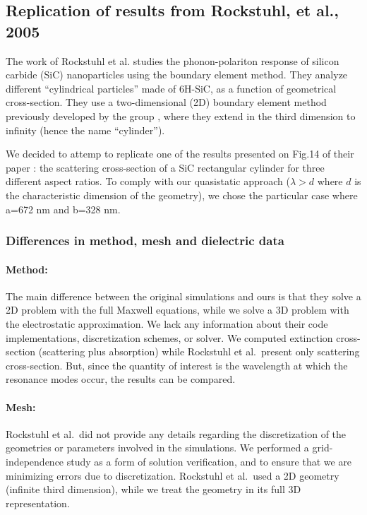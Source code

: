 
\subsection{Replication of results from Rockstuhl, et al., 2005}

The work of Rockstuhl et al.\cite{rockstuhl2005} studies the phonon-polariton response of silicon carbide (SiC)
nanoparticles using the boundary element method. They analyze different ``cylindrical particles''
made of 6H-SiC, as a function of geometrical cross-section. 
They use a two-dimensional (2D) boundary element method 
previously developed by the group \cite{rockstuhl2003}, where they extend in the third dimension to infinity
(hence the name ``cylinder'').

We decided to attemp to replicate one of the results presented on Fig.14 of their paper \cite{rockstuhl2005}:
the scattering cross-section of a SiC rectangular cylinder for three different aspect ratios. 
To comply with our quasistatic approach ($\lambda > d$ where $d$ is the characteristic
dimension of the geometry), we chose the particular case where a=672 nm and b=328 nm.

\subsubsection{Differences in method, mesh and dielectric data}

\paragraph{Method:} The main difference between the original simulations and ours is that they solve a 2D problem with the 
full Maxwell equations, while we solve a 3D problem with the electrostatic approximation. 
We lack any information about their code implementations, discretization schemes, or solver.  
We computed extinction cross-section (scattering plus absorption) while Rockstuhl et al.\ present only scattering cross-section. 
But, since the quantity of interest is the wavelength at which the resonance modes occur, the results can be compared.

\paragraph{Mesh:} Rockstuhl et al.\ did not provide any details regarding the discretization of the geometries or 
parameters involved in the simulations.
We performed a grid-independence study as a form of solution verification, and to ensure that we are 
minimizing errors due to discretization. Rockstuhl et al.\ used a 2D geometry (infinite third dimension), while we treat the geometry in its full 3D representation.

